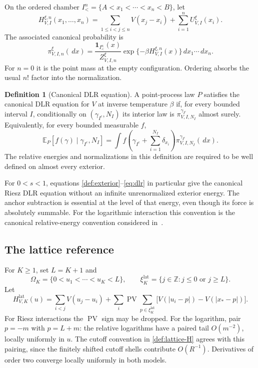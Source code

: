 \documentclass[11pt,reqno]{amsart}
\numberwithin{equation}{section}
\theoremstyle{definition}
\newtheorem{definition}[theorem]{Definition}
\newcommand{\Z}{\mathbb Z}
\newcommand{\E}{\mathbb E}
\newcommand{\1}{\mathbf 1}
\newcommand{\dd}{\,d}
\DeclareMathOperator{\PV}{PV}
\begin{document}
On the ordered chamber
$I_<^n=\{A<x_1<\cdots<x_n<B\}$, let
\begin{equation}\label{def:hamiltonian}
H_{V,I}^{\xi,n}(x_1,\ldots,x_n)
=\sum_{1\le i<j\le n}V(x_j-x_i)
+\sum_{i=1}^nU_{V,I}^{\xi}(x_i).
\end{equation}
The associated canonical probability is
\begin{equation}\label{def:kernel}
\pi_{V,I,n}^{\xi}(\dd x)=
\frac{\1_{I_<^n}(x)}{Z_{V,I,n}^{\xi}}
\exp\{-\beta H_{V,I}^{\xi,n}(x)\}\dd x_1\cdots\dd x_n.
\end{equation}
For $n=0$ it is the point mass at the empty configuration. Ordering
absorbs the usual $n!$ factor into the normalization.

\begin{definition}[Canonical DLR equation]\label{def:dlr}
A point-process law $P$ satisfies the canonical DLR equation for $V$
at inverse temperature $\beta$ if, for every bounded interval $I$,
conditionally on $(\gamma_{I^c},N_I)$ its interior law is
$\pi_{V,I,N_I}^{\gamma_{I^c}}$ almost surely. Equivalently, for every
bounded measurable $f$,
\begin{equation}\label{eq:dlr}
\E_P\!\left[f(\gamma)\mid\gamma_{I^c},N_I\right]
=\int f\!\left(\gamma_{I^c}+\sum_{i=1}^{N_I}\delta_{x_i}\right)
\pi_{V,I,N_I}^{\gamma_{I^c}}(\dd x).
\end{equation}
The relative energies and normalizations in this definition are
required to be well defined on almost every exterior.
\end{definition}

For $0<s<1$, equations \eqref{def:exterior}--\eqref{eq:dlr} in particular
give the canonical Riesz DLR equation without an infinite unrenormalized
exterior energy. The anchor subtraction is essential at the level of
that energy, even though its force is absolutely summable.
For the logarithmic interaction this convention is the canonical
relative-energy convention considered in~\cite{DHLM}.

\subsection{The lattice reference}
For $K\ge1$, set $L=K+1$ and
\[
\Omega_K=\{0<u_1<\cdots<u_K<L\},\qquad
\xi_K^{\mathrm{lat}}=\{j\in\Z:j\le0\text{ or }j\ge L\}.
\]
Let
\begin{equation}\label{def:lattice-H}
H^{\mathrm{lat}}_{V,K}(u)=
\sum_{i<j}V(u_j-u_i)+
\sum_i\PV\sum_{p\in\xi_K^{\mathrm{lat}}}
\bigl[V(|u_i-p|)-V(|x_*-p|)\bigr].
\end{equation}
For Riesz interactions the $\PV$ sign may be dropped.
For the logarithm, pair $p=-m$ with $p=L+m$: the relative logarithms
have a paired tail $O(m^{-2})$, locally uniformly in $u$.
The cutoff convention in \eqref{def:lattice-H} agrees with this pairing,
since the finitely shifted cutoff shells contribute $O(R^{-1})$.
Derivatives of order two converge locally uniformly in both models.
\end{document}
